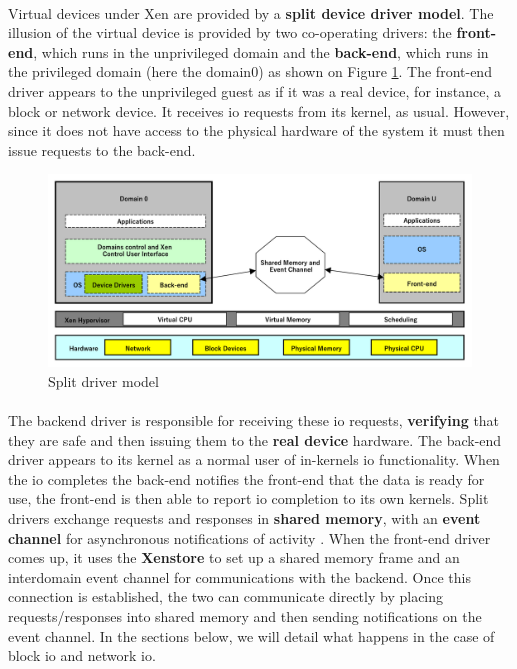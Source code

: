 \paragraph{} Virtual devices under Xen are provided by a \textbf{split device driver model}. The illusion of the virtual device is provided by two co-operating drivers: the \textbf{front-end}, which runs in the unprivileged domain and the \textbf{back-end}, which runs in the privileged domain (here the domain0) as shown on Figure \ref{fig:split-model}. The front-end driver appears to the unprivileged guest as if it was a real device, for instance, a block or network device. It receives \acrshort{io} requests from its kernel, as usual. However, since it does not have access to the physical hardware of the system it must then issue requests to the back-end. 

\begin{figure}[!h]
    \centering
    \includegraphics[width=\linewidth]{fig02/split-driver.pdf}
    \caption{Split driver model}
    \label{fig:split-model}
\end{figure}

\paragraph{} The backend driver is responsible for receiving these \acrshort{io} requests, \textbf{verifying} that they are safe and then issuing them to the \textbf{real device} hardware. The back-end driver appears to its kernel as a normal user of in-\glspl{kernel} \acrshort{io} functionality. When the \acrshort{io} completes the back-end notifies the front-end that the data is ready for use, the front-end is then able to report \acrshort{io} completion to its own \glspl{kernel}. Split drivers exchange requests and responses in \textbf{shared memory}, with an \textbf{event channel} for asynchronous notifications of activity \citep{xen_book}. When the front-end driver comes up, it uses the \textbf{Xenstore} to set up a shared memory frame and an interdomain event channel for communications with the backend. Once this connection is established, the two can communicate directly by placing requests/responses into shared memory and then sending notifications on the event channel. In the sections below, we will detail what happens in the case of block \acrshort{io} and network \acrshort{io}.

